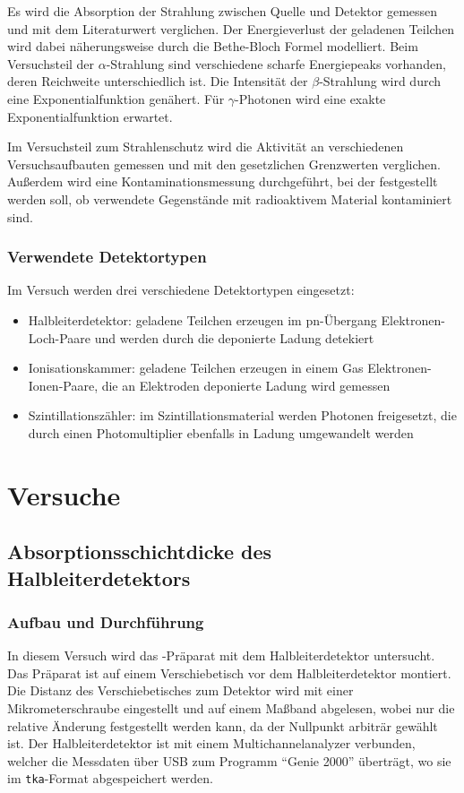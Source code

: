 \documentclass{../Misc/MontavonLaTeX/Montavon}
\begin{document}
Es wird die Absorption der Strahlung zwischen Quelle und Detektor gemessen und mit dem Literaturwert verglichen. Der Energieverlust der geladenen Teilchen wird dabei näherungsweise durch die Bethe-Bloch Formel modelliert. Beim Versuchsteil der $\alpha$-Strahlung sind verschiedene scharfe Energiepeaks vorhanden, deren Reichweite unterschiedlich ist. Die Intensität der $\beta$-Strahlung wird durch eine Exponentialfunktion genähert. Für $\gamma$-Photonen wird eine exakte Exponentialfunktion erwartet.

Im Versuchsteil zum Strahlenschutz wird die Aktivität an verschiedenen Versuchsaufbauten gemessen und mit den gesetzlichen Grenzwerten verglichen. Außerdem wird eine Kontaminationsmessung durchgeführt, bei der festgestellt werden soll, ob verwendete Gegenstände mit radioaktivem Material kontaminiert sind.

\subsubsection{Verwendete Detektortypen}
Im Versuch werden drei verschiedene Detektortypen eingesetzt: 
\begin{itemize}
\item Halbleiterdetektor: geladene Teilchen erzeugen im pn-Übergang Elektronen-Loch-Paare und werden durch die deponierte Ladung detekiert 
\item Ionisationskammer: geladene Teilchen erzeugen in einem Gas Elektronen-Ionen-Paare, die an Elektroden deponierte Ladung wird gemessen 
\item Szintillationszähler: im Szintillationsmaterial werden Photonen freigesetzt, die durch einen Photomultiplier ebenfalls in Ladung umgewandelt werden
\end{itemize}

\section{Versuche}
\subsection{Absorptionsschichtdicke des Halbleiterdetektors}
\subsubsection{Aufbau und Durchführung}
In diesem Versuch wird das -Präparat mit dem Halbleiterdetektor untersucht. Das Präparat ist auf einem Verschiebetisch vor dem Halbleiterdetektor montiert. Die Distanz des Verschiebetisches zum Detektor wird mit einer Mikrometerschraube eingestellt und auf einem Maßband abgelesen, wobei nur die relative Änderung festgestellt werden kann, da der Nullpunkt arbiträr gewählt ist. Der Halbleiterdetektor ist mit einem Multichannelanalyzer verbunden, welcher die Messdaten über USB zum Programm \enquote{Genie 2000} überträgt, wo sie im \texttt{tka}-Format abgespeichert werden.
\end{document}

